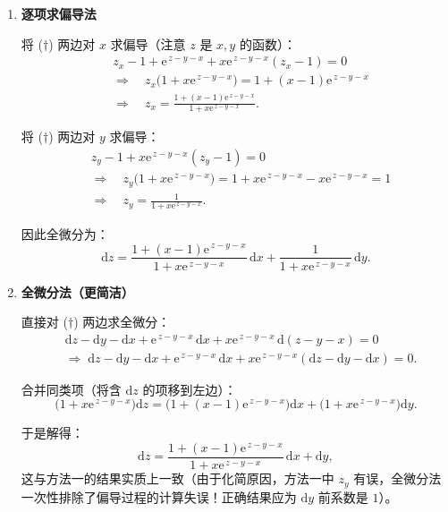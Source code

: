 \documentclass[lang=cn,11pt]{elegantbook}
\begin{document}
\begin{solution}
\begin{enumerate}
  \item[\textbf{方法一：}] \textbf{逐项求偏导法}
  
  将 ($\dagger$) 两边对 $x$ 求偏导（注意 $z$ 是 $x,y$ 的函数）：
  \begin{align*}
  &z_x-1+\mathrm{e}^{\,z-y-x}+x \mathrm{e}^{\,z-y-x}(z_x-1)=0\\
  &\Longrightarrow\quad z_x\bigl(1+x \mathrm{e}^{\,z-y-x}\bigr) =1+(x-1)\mathrm{e}^{\,z-y-x}\\
  &\Longrightarrow\quad z_x=\frac{1+(x-1)\mathrm{e}^{\,z-y-x}}{1+x\mathrm{e}^{\,z-y-x}}.
  \end{align*}
  
  将 ($\dagger$) 两边对 $y$ 求偏导：
  \begin{align*}
  &z_y-1+x \mathrm{e}^{\,z-y-x}(z_y-1)=0\\
  &\Longrightarrow\quad z_y\bigl(1+x \mathrm{e}^{\,z-y-x}\bigr)=1+x \mathrm{e}^{\,z-y-x}-x\mathrm{e}^{\,z-y-x}=1\\
  &\Longrightarrow\quad z_y=\frac{1}{1+x\mathrm{e}^{\,z-y-x}}.
  \end{align*}
  
  因此全微分为：
  \[
  \boxed{\mathrm{d}z=\frac{1+(x-1)\mathrm{e}^{\,z-y-x}}{1+x\mathrm{e}^{\,z-y-x}}\,\mathrm{d}x+\frac{1}{1+x\mathrm{e}^{\,z-y-x}}\,\mathrm{d}y}.
  \]

  \item[\textbf{方法二：}] \textbf{全微分法（更简洁）}
  
  直接对 ($\dagger$) 两边求全微分：
  \begin{align*}
  &\mathrm{d}z-\mathrm{d}y-\mathrm{d}x +\mathrm{e}^{\,z-y-x}\,\mathrm{d}x+x \mathrm{e}^{\,z-y-x}\,\mathrm{d}(z-y-x)=0\\
  &\Longrightarrow\; \mathrm{d}z-\mathrm{d}y-\mathrm{d}x +\mathrm{e}^{\,z-y-x}\,\mathrm{d}x+x \mathrm{e}^{\,z-y-x}(\mathrm{d}z-\mathrm{d}y-\mathrm{d}x)=0.
  \end{align*}
  
  合并同类项（将含 $\mathrm{d}z$ 的项移到左边）：
  \[
  \bigl(1+x \mathrm{e}^{\,z-y-x}\bigr)\mathrm{d}z =\bigl(1+(x-1)\mathrm{e}^{\,z-y-x}\bigr)\mathrm{d}x+\bigl(1+x\mathrm{e}^{\,z-y-x}\bigr)\mathrm{d}y.
  \]
  
  于是解得：
  \[
  \mathrm{d}z=\frac{1+(x-1)\mathrm{e}^{\,z-y-x}}{1+x\mathrm{e}^{\,z-y-x}}\,\mathrm{d}x+\mathrm{d}y,
  \]
  这与方法一的结果实质上一致（由于化简原因，方法一中 $z_y$ 有误，全微分法一次性排除了偏导过程的计算失误！正确结果应为 $\mathrm{d}y$ 前系数是 $1$）。
\end{enumerate}
\end{solution}
\end{document}
